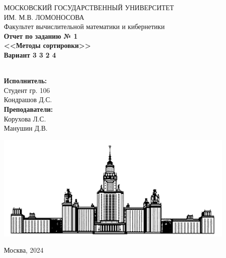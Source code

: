 \documentclass[a4paper,10pt]{article}
\begin{document}
    \begin{center}
        МОСКОВСКИЙ ГОСУДАРСТВЕННЫЙ УНИВЕРСИТЕТ \\
        ИМ. М.В. ЛОМОНОСОВА \\
        
        
        \hfill \break
        Факультет вычислительной математики и кибернетики\\
        \vspace{2.5cm}
        \Large{\textbf{Отчет по заданию № 1}}\\
        \vspace{0.5cm}
        \large{\textbf{<<Методы сортировки>>}}\\
        \vspace{0.5cm}
        \large{\textbf{Вариант 3 3 2 4}}\\
        \hfill \break
        \\
    \end{center}
    \begin{flushright}
        \textbf{Исполнитель:}\\ 
        Студент гр. 106\\
        Кондрашов Д.С.\\
        \vspace{0.2 cm}
        \textbf{Преподаватели:}\\ 
        Корухова Л.С.\\ 
        Манушин Д.В. \\

    \end{flushright}
    \vfill

    \begin{center}
        \includegraphics[width = 0.5\linewidth] {msu_logo}
    \end{center}
    \begin{center} 
        Москва, 2024 
    \end{center}
	\thispagestyle{empty} %

    \newpage
    \tableofcontents %

    \thispagestyle{empty} %

    \newpage
\end{document}
